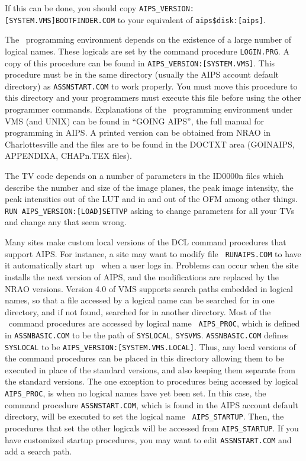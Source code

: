 \medskip

\noindent
If this can be done, you should copy
{\tt AIPS\_VERSION:[SYSTEM.VMS]BOOTFINDER.COM} to your equivalent of
{\tt aips\$disk:[aips]}.

\medskip{}

The \aips\ programming environment depends on the existence of a large
number of logical names.  These logicals are set by the command
procedure {\tt LOGIN.PRG}.  A copy of this procedure can be found in
{\tt AIPS\_VERSION:[SYSTEM.VMS]}.  This procedure must be in the same
directory (usually the AIPS account default directory) as {\tt ASSNSTART.COM}
to work properly.  You must move this procedure to this directory and
your programmers must execute this file before using the other
programmer commands.  Explanations of the \aips\ programming environment
under VMS (and UNIX) can be found in ``GOING AIPS'', the full manual for
programming in AIPS.  A printed version can be obtained from NRAO in
Charlottesville and the files are to be found in the DOCTXT area
(GOINAIPS, APPENDIXA, CHAPn.TEX files).

\medskip{}

The TV code depends on a number of parameters in the ID0000n files
which describe the number and size of the image planes, the peak image
intensity, the peak intensities out of the LUT and in and out of the
OFM among other things.  {\tt RUN AIPS\_VERSION:[LOAD]SETTVP} asking to
change parameters for all your TVs and change any that seem wrong.

\medskip{}

Many sites make custom local versions of the DCL command procedures
that support AIPS.  For instance, a site may want to modify file {\tt
RUNAIPS.COM} to have it automatically start up \aips\ when a user logs
in.  Problems can occur when the site installs the next version of
AIPS, and the modifications are replaced by the NRAO versions.
Version 4.0 of VMS supports search paths embedded in logical names, so
that a file accessed by a logical name can be searched for in one
directory, and if not found, searched for in another directory.  Most
of the \aips\ command procedures are accessed by logical name {\tt
AIPS\_PROC}, which is defined in {\tt ASSNBASIC.COM} to be the path of
{\tt SYSLOCAL}, {\tt SYSVMS}.  {\tt ASSNBASIC.COM} defines {\tt
SYSLOCAL} to be {\tt AIPS\_VERSION:[SYSTEM.VMS.LOCAL]}.  Thus, any
local versions of the command procedures can be placed in this
directory allowing them to be executed in place of the standard
versions, and also keeping them separate from the standard versions.
The one exception to procedures being accessed by logical {\tt AIPS\_PROC},
is when no logical names have yet been set.  In this case, the command
procedure {\tt ASSNSTART.COM}, which is found in the AIPS account default
directory, will be executed to set the logical name {\tt
AIPS\_STARTUP}.  Then, the procedures that set the other logicals will
be accessed from {\tt AIPS\_STARTUP}.  If you have customized startup
procedures, you may want to edit {\tt ASSNSTART.COM} and add a search path.

